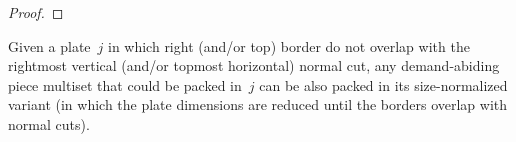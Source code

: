\documentclass[runningheads]{llncs}
\begin{document}
\begin{proof}
\end{proof}

\begin{corollary}
Given a plate~\(j\) in which right (and/or top) border do not overlap with the rightmost vertical (and/or topmost horizontal) normal cut, any demand-abiding piece multiset that could be packed in~\(j\) can be also packed in its size-normalized variant (in which the plate dimensions are reduced until the borders overlap with normal cuts).
\end{corollary}
\end{document}
